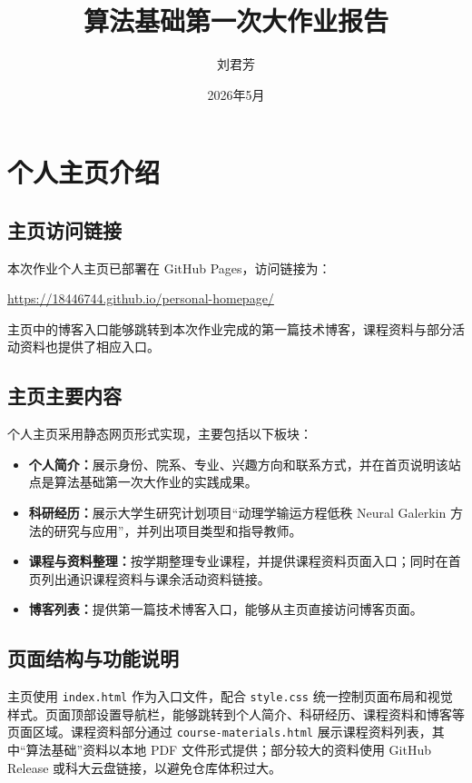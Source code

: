 \documentclass[UTF8,a4paper,12pt]{ctexart}
\title{算法基础第一次大作业报告}
\author{刘君芳}
\date{2026年5月}
\begin{document}
\maketitle

\section{个人主页介绍}

\subsection{主页访问链接}

本次作业个人主页已部署在 GitHub Pages，访问链接为：
\begin{center}
  \url{https://18446744.github.io/personal-homepage/}
\end{center}

主页中的博客入口能够跳转到本次作业完成的第一篇技术博客，课程资料与部分活动资料也提供了相应入口。

\subsection{主页主要内容}

个人主页采用静态网页形式实现，主要包括以下板块：

\begin{itemize}
  \item \textbf{个人简介：}展示身份、院系、专业、兴趣方向和联系方式，并在首页说明该站点是算法基础第一次大作业的实践成果。
  \item \textbf{科研经历：}展示大学生研究计划项目“动理学输运方程低秩 Neural Galerkin 方法的研究与应用”，并列出项目类型和指导教师。
  \item \textbf{课程与资料整理：}按学期整理专业课程，并提供课程资料页面入口；同时在首页列出通识课程资料与课余活动资料链接。
  \item \textbf{博客列表：}提供第一篇技术博客入口，能够从主页直接访问博客页面。
\end{itemize}

\subsection{页面结构与功能说明}

主页使用 \texttt{index.html} 作为入口文件，配合 \texttt{style.css} 统一控制页面布局和视觉样式。页面顶部设置导航栏，能够跳转到个人简介、科研经历、课程资料和博客等页面区域。课程资料部分通过 \texttt{course-materials.html} 展示课程资料列表，其中“算法基础”资料以本地 PDF 文件形式提供；部分较大的资料使用 GitHub Release 或科大云盘链接，以避免仓库体积过大。
\end{document}
